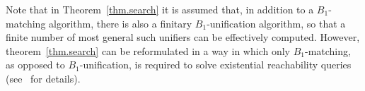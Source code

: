 Note that in Theorem~\ref{thm.search} it is assumed that, in addition
to a $B_{1}$-matching algorithm, there is also a finitary
$B_{1}$-unification algorithm, so that a finite number of most general
such unifiers can be effectively computed. However,
theorem~\ref{thm.search} can be reformulated in a way in which only
$B_{1}$-matching, as opposed to $B_{1}$-unification, is required to
solve existential reachability queries
(see~\cite{rocha-rewsmtjlamp-2017} for details).
